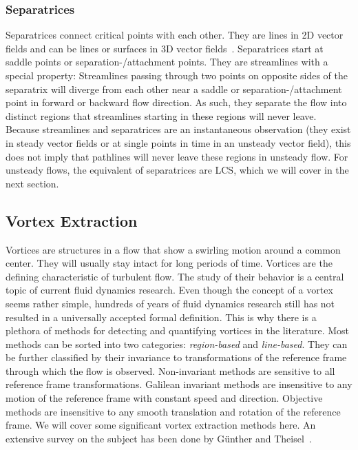 \subsubsection{Separatrices} %
\label{ssub:separatrices}
%
Separatrices connect critical points with each other.
%
They are lines in \ac{2D} vector fields and can be lines or surfaces in \ac{3D}
vector fields~\cite{Helman1989,Helman1991}.
%
Separatrices start at saddle points or separation-/attachment points.
%
They are streamlines with a special property: Streamlines passing through two
points on opposite sides of the separatrix will diverge from each other near a
saddle or separation-/attachment point in forward or backward flow direction.
%
As such, they separate the flow into distinct regions that streamlines starting
in these regions will never leave.
%
Because streamlines and separatrices are an instantaneous observation (they
exist in steady vector fields or at single points in time in an unsteady vector
field), this does not imply that pathlines will never leave these regions in
unsteady flow.
%
For unsteady flows, the equivalent of separatrices are \acl{LCS}, which we will
cover in the next section.
%
%
%
\subsection{Vortex Extraction} %
\label{sub:vortex_extraction}
%
Vortices are structures in a flow that show a swirling motion around a common
center.
%
They will usually stay intact for long periods of time.
%
Vortices are the defining characteristic of turbulent flow.
%
The study of their behavior is a central topic of current fluid dynamics
research.
%
Even though the concept of a vortex seems rather simple, hundreds of years of
fluid dynamics research still has not resulted in a universally accepted formal
definition.
%
This is why there is a plethora of methods for detecting and quantifying
vortices in the literature.
%
Most methods can be sorted into two categories: \emph{region-based} and
\emph{line-based}.
%
They can be further classified by their invariance to transformations of the
reference frame through which the flow is observed.
%
Non-invariant methods are sensitive to all reference frame transformations.
%
Galilean invariant methods are insensitive to any motion of the reference frame
with constant speed and direction.
%
Objective methods are insensitive to any smooth translation and rotation of the
reference frame.
%
We will cover some significant vortex extraction methods here.
%
An extensive survey on the subject has been done by G\"unther and
Theisel~\cite{Guenther2018}.
%

